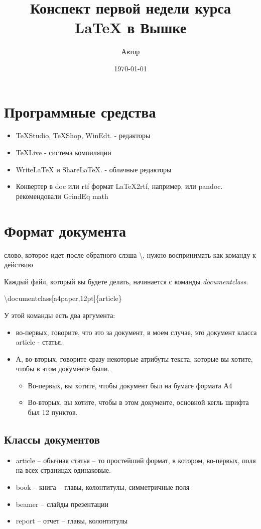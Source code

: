 \documentclass[a4paper,12pt]{article} %
\author{Автор}
\title{Конспект первой недели курса \LaTeX{} в Вышке}
\date{\today}
\begin{document}
	\maketitle
\section{Программные средства}
\begin{itemize}
	\item 	TeXStudio, TeXShop, WinEdt. - редакторы 
	\item TeXLive - система компиляции 
	\item WriteLaTeX и ShareLaTeX. - облачные редакторы
	\item Конвертер в doc или rtf формат LaTeX2rtf, например, или pandoc.  рекомендовали GrindEq math
		
\end{itemize}
\section{Формат документа}
 слово, которое идет  после обратного слэша \textbackslash , нужно воспринимать как  команду к действию
 
 Каждый файл, который вы будете делать, начинается с команды \textit{documentclass}.
 
 
 \textbackslash documentclass[a4paper,12pt]\{article\} 
 
 У этой команды  есть два аргумента:
 \begin{itemize}
 	\item во-первых, говорите, что это за документ, в моем случае, это документ
 	класса article - статья.
 	\item А, во-вторых, говорите сразу некоторые
 	атрибуты текста, которые вы хотите, чтобы в этом документе
 	были.
 	\begin{itemize}
 		\item Во-первых, вы хотите, чтобы документ был
 		на бумаге формата А4
 		\item Во-вторых, вы хотите, чтобы в этом документе,
 		основной кегль шрифта был 12 пунктов.
 	\end{itemize}
 \end{itemize}
\subsection{Классы документов}
\begin{itemize}
	\item article -- обычная статья  -- то простейший формат, в котором, во-первых, поля на всех страницах	одинаковые.
	\item book -- книга -- главы, колонтитулы, симметричные поля
	\item beamer -- слайды презентации
	\item report -- отчет -- главы, колонтитулы
\end{itemize}
\end{document}

